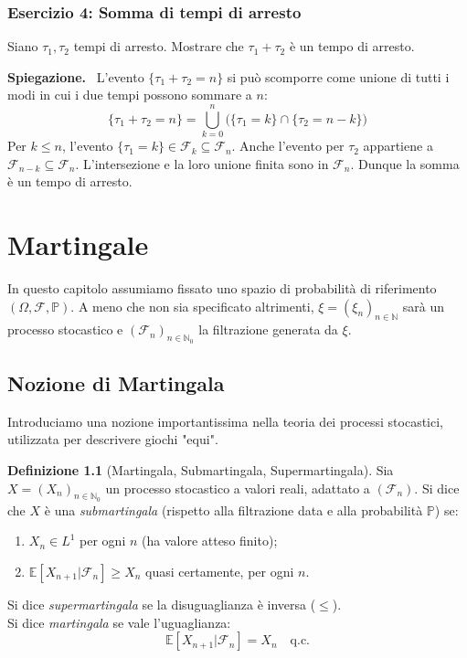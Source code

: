 \documentclass[11pt, a4paper]{report}
\theoremstyle{plain}
\theoremstyle{definition}
\newtheorem{definition}[theorem]{Definizione}
\theoremstyle{remark}
\newenvironment{spiegazione}[1][Spiegazione]
{\begin{mdframed}[backgroundcolor=green!5, linecolor=green!50, linewidth=2pt, topline=false, rightline=false, bottomline=false]
\textbf{\textsf{#1.}}\ }
{\end{mdframed}}
\newcommand{\PP}{\mathbb{P}}
\newcommand{\E}{\mathbb{E}}
\newcommand{\F}{\mathcal{F}}
\newcommand{\N}{\mathbb{N}}
\newcommand{\1}{\mathbf{1}}
\begin{document}
\subsection*{Esercizio 4: Somma di tempi di arresto}
Siano $\tau_1, \tau_2$ tempi di arresto. Mostrare che $\tau_1 + \tau_2$ è un tempo di arresto.
\begin{spiegazione}
L'evento $\{\tau_1 + \tau_2 = n\}$ si può scomporre come unione di tutti i modi in cui i due tempi possono sommare a $n$:
\[ \{\tau_1 + \tau_2 = n\} = \bigcup_{k=0}^n \big(\{\tau_1 = k\} \cap \{\tau_2 = n-k\}\big) \]
Per $k \le n$, l'evento $\{\tau_1 = k\} \in \F_k \subseteq \F_n$. Anche l'evento per $\tau_2$ appartiene a $\F_{n-k} \subseteq \F_n$. L'intersezione e la loro unione finita sono in $\F_n$. Dunque la somma è un tempo di arresto.
\end{spiegazione}



\chapter{Martingale}

In questo capitolo assumiamo fissato uno spazio di probabilità di riferimento $(\Omega, \F, \PP)$. A meno che non sia specificato altrimenti, $\xi = (\xi_n)_{n \in \N}$ sarà un processo stocastico e $(\F_n)_{n \in \N_0}$ la filtrazione generata da $\xi$.

\section{Nozione di Martingala}

Introduciamo una nozione importantissima nella teoria dei processi stocastici, utilizzata per descrivere giochi "equi".

\begin{definition}[Martingala, Submartingala, Supermartingala]
Sia $X = (X_n)_{n \in \N_0}$ un processo stocastico a valori reali, adattato a $(\F_n)$. Si dice che $X$ è una \emph{submartingala} (rispetto alla filtrazione data e alla probabilità $\PP$) se:
\begin{enumerate}
    \item $X_n \in L^1$ per ogni $n$ (ha valore atteso finito);
    \item $\E[X_{n+1} | \F_n] \ge X_n$ quasi certamente, per ogni $n$.
\end{enumerate}
Si dice \emph{supermartingala} se la disuguaglianza è inversa ($\le$). \\
Si dice \emph{martingala} se vale l'uguaglianza:
\[ \E[X_{n+1} | \F_n] = X_n \quad \text{q.c.} \]
\end{definition}
\end{document}
